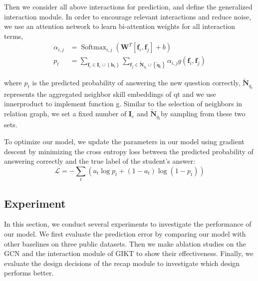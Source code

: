 \documentclass[11pt,en]{elegantpaper}
\begin{document}
Then we consider all above interactions for prediction, and define the generalized interaction module. In order to encourage relevant interactions and reduce noise, we use an attention network to learn bi-attention weights for all interaction terms,
$$\begin{aligned} \alpha_{i, j} &=\operatorname{Softmax}_{i, j}\left(\boldsymbol{W}^{T}\left[\boldsymbol{f}_{i}, \boldsymbol{f}_{j}\right]+b\right) \\ p_{t} &=\sum_{\boldsymbol{f}_{i} \in \mathbf{I}_{e} \cup\left\{\mathbf{h}_{t}\right\}} \sum_{\boldsymbol{f}_{j} \in \widetilde{\mathbf{N}}_{q_{t}} \cup\left\{\widetilde{\mathbf{q}}_{t}\right\}} \alpha_{i, j} g\left(\boldsymbol{f}_{i}, \boldsymbol{f}_{j}\right) \end{aligned}$$

where $p_t$ is the predicted probability of answering the new question correctly, $\widetilde{\mathbf{N}}_{q_{t}}$ represents the aggregated neighbor skill embeddings of qt and we use innerproduct to implement function g. Similar to the selection of neighbors in relation graph, we set a fixed number of $\mathbf{I}_{e}$ and $\widetilde{\mathbf{N}}_{q_{t}}$by sampling from these two sets.

To optimize our model, we update the parameters in our model using gradient descent by minimizing the cross entropy loss between the predicted probability of answering correctly and the true label of the student’s answer:
$$\mathcal{L}=-\sum_{t}\left(a_{t} \log p_{t}+\left(1-a_{t}\right) \log \left(1-p_{t}\right)\right)$$

\subsection{Experiment}
In this section, we conduct several experiments to investigate the performance of our model. We first evaluate the prediction error by comparing our model with other baselines on three public datasets. Then we make ablation studies on the GCN and the interaction module of GIKT to show their effectiveness. Finally, we evaluate the design decisions of the recap module to investigate which design performs better.
\end{document}

